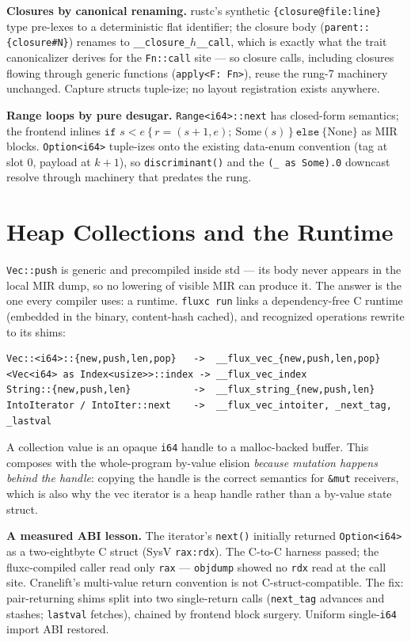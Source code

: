 \documentclass[11pt]{article}
\begin{document}
\textbf{Closures by canonical renaming.} rustc's synthetic
\texttt{\{closure@file:line\}} type pre-lexes to a deterministic flat
identifier; the closure body (\texttt{parent::\{closure\#N\}}) renames to
\texttt{\_\_closure\_$h$\_\_call}, which is exactly what the trait
canonicalizer derives for the \texttt{Fn::call} site --- so closure calls,
including closures flowing through generic functions
(\texttt{apply<F: Fn>}), reuse the rung-7 machinery unchanged. Capture
structs tuple-ize; no layout registration exists anywhere.

\textbf{Range loops by pure desugar.} \texttt{Range<i64>::next} has
closed-form semantics; the frontend inlines
$\texttt{if } s<e\ \{\, r=(s{+}1,e);\ \mathrm{Some}(s) \,\}\ \texttt{else}\
\{\mathrm{None}\}$ as MIR blocks. \texttt{Option<i64>} tuple-izes onto the
existing data-enum convention (tag at slot 0, payload at $k{+}1$), so
\texttt{discriminant()} and the \texttt{(\_ as Some).0} downcast resolve
through machinery that predates the rung.

\section{Heap Collections and the Runtime}\label{sec:heap}
\texttt{Vec::push} is generic and precompiled inside std --- its body never
appears in the local MIR dump, so no lowering of visible MIR can produce it.
The answer is the one every compiler uses: a runtime. \texttt{fluxc run} links
a dependency-free C runtime (embedded in the binary, content-hash cached), and
recognized operations rewrite to its shims:

\begin{lstlisting}
Vec::<i64>::{new,push,len,pop}   ->  __flux_vec_{new,push,len,pop}
<Vec<i64> as Index<usize>>::index -> __flux_vec_index
String::{new,push,len}           ->  __flux_string_{new,push,len}
IntoIterator / IntoIter::next    ->  __flux_vec_intoiter, _next_tag, _lastval
\end{lstlisting}

A collection value is an opaque \texttt{i64} handle to a malloc-backed buffer.
This composes with the whole-program by-value elision \emph{because mutation
happens behind the handle}: copying the handle is the correct semantics for
\texttt{\&mut} receivers, which is also why the vec iterator is a heap handle
rather than a by-value state struct.

\textbf{A measured ABI lesson.} The iterator's \texttt{next()} initially
returned \texttt{Option<i64>} as a two-eightbyte C struct (SysV
\texttt{rax:rdx}). The C-to-C harness passed; the fluxc-compiled caller read
only \texttt{rax} --- \texttt{objdump} showed no \texttt{rdx} read at the call
site. Cranelift's multi-value return convention is not C-struct-compatible.
The fix: pair-returning shims split into two single-return calls
(\texttt{next\_tag} advances and stashes; \texttt{lastval} fetches), chained
by frontend block surgery. Uniform single-\texttt{i64} import ABI restored.
\end{document}
